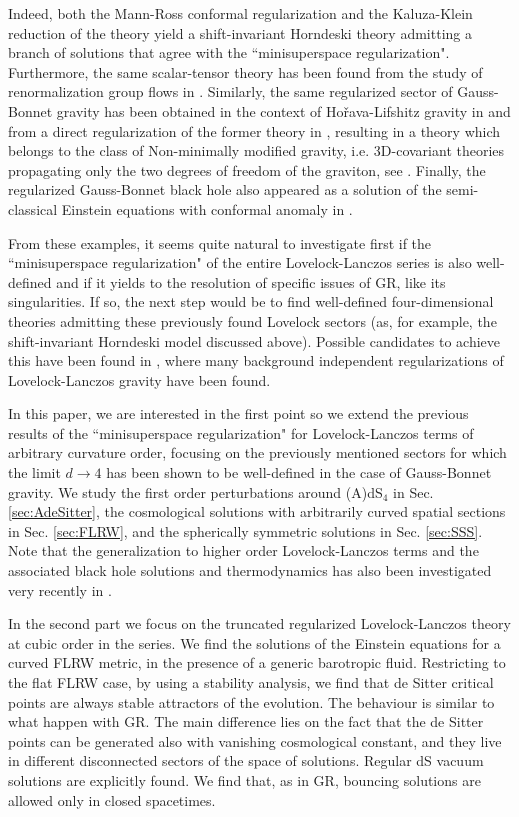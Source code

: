 \documentclass[aps,prd,preprint,nofootinbib]{revtex4-1}
\begin{document}
Indeed, both the Mann-Ross conformal regularization \cite{ConfGB2,ConfGB1,ConGB12} and the Kaluza-Klein reduction of the theory \cite{HornGB1,HornGB2} yield a shift-invariant Horndeski theory admitting a branch of solutions that agree with the ``minisuperspace regularization". Furthermore, the same scalar-tensor theory has been found from the study of renormalization group flows in \cite{RenGroupAnomCCRGB}. Similarly, the same regularized sector of Gauss-Bonnet gravity has been obtained in the context of Ho\v{r}ava-Lifshitz gravity in \cite{Horava} and from a direct regularization of the former theory in \cite{3Dcov1,3Dcov2,3Dcov3}, resulting in a theory which belongs to the class of Non-minimally modified gravity, i.e. 3D-covariant theories propagating only the two degrees of freedom of the graviton, see \cite{MMG1,MMG2,MMG3,MMG4,MMG5}. 
Finally, the regularized Gauss-Bonnet black hole also appeared as a solution of the semi-classical Einstein equations with conformal anomaly in \cite{conformal}.


From these examples, it seems quite natural to investigate first if the ``minisuperspace regularization" of the entire Lovelock-Lanczos series is also well-defined and if it yields to the resolution of specific issues of GR, like its singularities. If so, the next step would be to find well-defined four-dimensional theories admitting these previously found Lovelock sectors (as, for example, the shift-invariant Horndeski model discussed above). Possible candidates to achieve this have been found in \cite{DALLG}, where many background independent regularizations of Lovelock-Lanczos gravity have been found.



In this paper, we are interested in the first point so we extend the previous results of the ``minisuperspace regularization" for Lovelock-Lanczos terms of arbitrary curvature order, focusing on the previously mentioned sectors for which the limit $d\to 4$ has been shown to be well-defined in the case of Gauss-Bonnet gravity. We study the first order perturbations around (A)dS$_4$ in Sec. \ref{sec:AdeSitter}, the cosmological solutions with arbitrarily curved spatial sections in Sec. \ref{sec:FLRW}, and the spherically symmetric solutions in Sec. \ref{sec:SSS}. Note that the generalization to higher order Lovelock-Lanczos terms and the associated black hole solutions and thermodynamics has also been investigated very recently in \cite{higherorderLovelockblackholes}.


In the second part we focus on the truncated regularized Lovelock-Lanczos theory at cubic order in the series. We find the solutions of the Einstein equations for a curved FLRW metric, in the presence of a generic barotropic fluid. Restricting to the flat FLRW case, by using a stability analysis, we find that de Sitter critical points are always stable attractors of the evolution. The behaviour is similar to what happen with GR. The main difference lies on the fact that the de Sitter points can be generated also with vanishing cosmological constant, and they live in different disconnected sectors of the space of solutions. Regular dS vacuum solutions are explicitly found. We find that, as in GR, bouncing solutions are allowed only in closed spacetimes.
\end{document}
